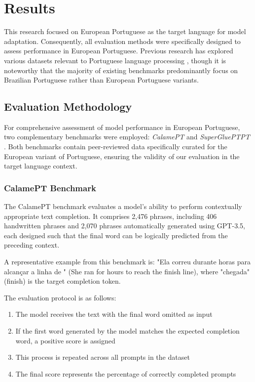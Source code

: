 
\chapter{Results}


\label{chap:results}

This research focused on European Portuguese as the target language for model adaptation. Consequently, all evaluation methods were specifically designed to assess performance in European Portuguese. Previous research has explored various datasets relevant to Portuguese language processing \cite{}, though it is noteworthy that the majority of existing benchmarks predominantly focus on Brazilian Portuguese rather than European Portuguese variants.


\section{Evaluation Methodology}
For comprehensive assessment of model performance in European Portuguese, two complementary benchmarks were employed: \textit{CalamePT} \cite{calamept_reference} and \textit{SuperGluePTPT} \cite{superglue_reference}. Both benchmarks contain peer-reviewed data specifically curated for the European variant of Portuguese, ensuring the validity of our evaluation in the target language context.

\subsection{CalamePT Benchmark}
The CalamePT benchmark evaluates a model's ability to perform contextually appropriate text completion. It comprises 2,476 phrases, including 406 handwritten phrases and 2,070 phrases automatically generated using GPT-3.5, each designed such that the final word can be logically predicted from the preceding context.

A representative example from this benchmark is: "Ela correu durante horas para alcançar a linha de " (She ran for hours to reach the finish line), where "chegada" (finish) is the target completion token.

The evaluation protocol is as follows:
\begin{enumerate}
    \item The model receives the text with the final word omitted as input
    \item If the first word generated by the model matches the expected completion word, a positive score is assigned
    \item This process is repeated across all prompts in the dataset
    \item The final score represents the percentage of correctly completed prompts
\end{enumerate}

